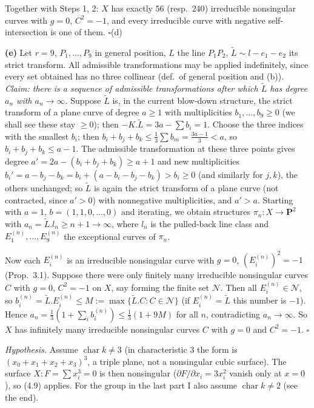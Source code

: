 \documentclass[11pt]{article}
\begin{document}
Together with Steps 1, 2: $X$ has exactly $56$ (resp.\ $240$) irreducible nonsingular curves with $g=0$, $C^2=-1$, and every irreducible curve with negative self-intersection is one of them. \hfill$\square$(d)

\textbf{(e)} Let $r=9$, $P_1,\dots,P_9$ in general position, $L$ the line $P_1P_2$, $\widetilde L\sim l-e_1-e_2$ its strict transform. All admissible transformations may be applied indefinitely, since every set obtained has no three collinear (def.\ of general position and (b)). \emph{Claim: there is a sequence of admissible transformations after which $\widetilde L$ has degree $a_n$ with $a_n\to\infty$.} Suppose $\widetilde L$ is, in the current blow-down structure, the strict transform of a plane curve of degree $a\ge1$ with multiplicities $b_1,\dots,b_9\ge0$ (we shall see these stay $\ge0$); then $-K.\widetilde L=3a-\sum b_i=1$. Choose the three indices with the smallest $b_i$; then $b_i+b_j+b_k\le\frac13\sum b_m=\frac{3a-1}3<a$, so $b_i+b_j+b_k\le a-1$. The admissible transformation at these three points gives degree $a'=2a-(b_i+b_j+b_k)\ge a+1$ and new multiplicities $b_i'=a-b_j-b_k=b_i+(a-b_i-b_j-b_k)>b_i\ge0$ (and similarly for $j,k$), the others unchanged; so $\widetilde L$ is again the strict transform of a plane curve (not contracted, since $a'>0$) with nonnegative multiplicities, and $a'>a$. Starting with $a=1$, $b=(1,1,0,\dots,0)$ and iterating, we obtain structures $\pi_n:X\to\mathbf P^2$ with $a_n=\widetilde L.l_n\ge n+1\to\infty$, where $l_n$ is the pulled-back line class and $E^{(n)}_1,\dots,E_9^{(n)}$ the exceptional curves of $\pi_n$.

Now each $E^{(n)}_i$ is an irreducible nonsingular curve with $g=0$, $(E_i^{(n)})^2=-1$ (Prop.~3.1). Suppose there were only finitely many irreducible nonsingular curves $C$ with $g=0$, $C^2=-1$ on $X$, say forming the finite set $\mathcal N$. Then all $E_i^{(n)}\in\mathcal N$, so $b_i^{(n)}=\widetilde L.E_i^{(n)}\le M:=\max\{\widetilde L.C: C\in\mathcal N\}$ (if $E_i^{(n)}=\widetilde L$ this number is $-1$). Hence $a_n=\frac13(1+\sum_ib^{(n)}_i)\le\frac13(1+9M)$ for all $n$, contradicting $a_n\to\infty$. So $X$ has infinitely many irreducible nonsingular curves $C$ with $g=0$ and $C^2=-1$. \hfill$\square$

\pf
\emph{Hypothesis.} Assume $\operatorname{char}k\ne3$ (in characteristic $3$ the form is $(x_0+x_1+x_2+x_3)^3$, a triple plane, not a nonsingular cubic surface). The surface $X:F=\sum x_i^3=0$ is then nonsingular ($\partial F/\partial x_i=3x_i^2$ vanish only at $x=0$), so (4.9) applies. For the group in the last part I also assume $\operatorname{char}k\ne2$ (see the end).
\end{document}
